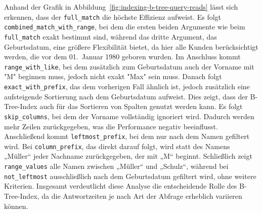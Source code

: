 Anhand der Grafik in Abbildung~\ref{fig:indexing-b-tree-query-reads} lässt sich erkennen, dass der \texttt{full\_match} die höchste Effizienz aufweist.
Es folgt \texttt{combined\_match\_with\_range}, bei dem die ersten beiden Argumente wie beim \texttt{full\_match} exakt bestimmt sind, während das dritte Argument, das Geburtsdatum, eine größere Flexibilität bietet, da hier alle Kunden berücksichtigt werden, die vor dem 01.\ Januar 1980 geboren wurden.
Im Anschluss kommt \texttt{range\_with\_like}, bei dem zusätzlich zum Geburtsdatum auch der Vorname mit "M" beginnen muss, jedoch nicht exakt "Max" sein muss.
Danach folgt \texttt{exact\_with\_prefix}, das dem vorherigen Fall ähnlich ist, jedoch zusätzlich eine aufsteigende Sortierung nach dem Geburtsdatum aufweist.
Dies zeigt, dass der B-Tree-Index auch für das Sortieren von Spalten genutzt werden kann.
Es folgt \texttt{skip\_columns}, bei dem der Vorname vollständig ignoriert wird.
Dadurch werden mehr Zeilen zurückgegeben, was die Performance negativ beeinflusst.
Anschließend kommt \texttt{leftmost\_prefix}, bei dem nur nach dem Namen gefiltert wird.
Bei \texttt{column\_prefix}, das direkt darauf folgt, wird statt des Namens „Müller“ jeder Nachname zurückgegeben, der mit „M“ beginnt.
Schließlich zeigt \texttt{range\_values} alle Namen zwischen „Müller“ und „Schulz“, während bei \texttt{not\_leftmost} ausschließlich nach dem Geburtsdatum gefiltert wird, ohne weitere Kriterien.
Insgesamt verdeutlicht diese Analyse die entscheidende Rolle des B-Tree-Index, da die Antwortzeiten je nach Art der Abfrage erheblich variieren können.

